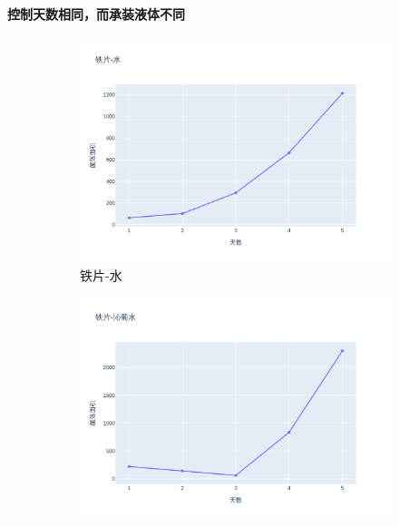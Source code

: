 \documentclass[12pt,a4paper]{ctexart}
\begin{document}
\paragraph{控制天数相同，而承装液体不同}
\begin{figure}[htbp]  %
    \centering  %
    \begin{subfigure}[b]{0.31\textwidth}  %
        \centering
        \includegraphics[width=\linewidth]{./plot/SingleMaterial/iron/铁片-水_line.png}  %
        \caption{铁片-水}  %
        \label{subfig:1}     %
    \end{subfigure}
    \hfill  %
    \begin{subfigure}[b]{0.31\textwidth}
        \centering
        \includegraphics[width=\linewidth]{./plot/SingleMaterial/iron/铁片-沁葡水_line.png}

\end{subfigure}
\end{figure}
\end{document}
